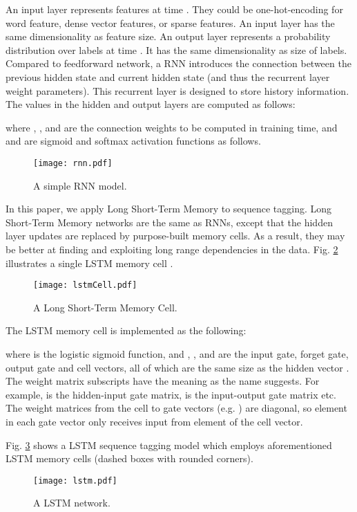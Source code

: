 \documentclass[11pt,a4paper]{article}
\begin{document}
An input layer represents features at time . They could be one-hot-encoding for word feature, dense vector features, or sparse features. An input layer has the same dimensionality as feature size. An output layer represents a probability distribution over labels at time . It has the same dimensionality as size of labels. Compared to feedforward network, a RNN introduces the connection between the previous hidden state and current hidden state (and thus the recurrent layer weight parameters).  This recurrent layer is designed to store history information. The values in the hidden and output layers are computed as follows:

where , , and  are the connection weights to be computed in training time, and 
 and  are sigmoid and softmax activation functions as follows.


\begin{figure}[htb]
	\centering
		\texttt{[image: rnn.pdf]}
	\caption{A simple RNN model.}
	\label{fig:rnn}
\end{figure} 

In this paper, we apply Long Short-Term Memory \cite{hochreiter1,graves1} to sequence tagging. Long Short-Term Memory networks are the same as RNNs, except that the hidden layer updates are replaced by purpose-built memory cells. As a result, they may be better at finding and exploiting long range dependencies in the data. Fig. \ref{fig:lstmCell} illustrates a single LSTM memory cell \cite{graves1}. 
\begin{figure}[htb]
	\centering
		\texttt{[image: lstmCell.pdf]}
	\caption{A Long Short-Term Memory Cell.}
	\label{fig:lstmCell}
\end{figure} 
The LSTM memory cell is implemented as the following:

where  is the logistic sigmoid function, and , ,  and  are the input gate, forget gate, output gate and cell vectors, all of which are the same size as the hidden vector . The weight matrix subscripts have the meaning as the name suggests. For example,  is the hidden-input gate matrix,  is the input-output gate matrix etc. The weight matrices from the cell to gate vectors (e.g. ) are diagonal, so element  in each gate vector only receives input from element  of the cell vector. 

Fig. \ref{fig:lstm} shows a LSTM sequence tagging model which employs aforementioned LSTM memory cells (dashed boxes with rounded  corners). 
\begin{figure}[!htb]
	\centering
		\texttt{[image: lstm.pdf]}
	\caption{A LSTM network.}
	\label{fig:lstm}
\end{figure} 
\end{document}

